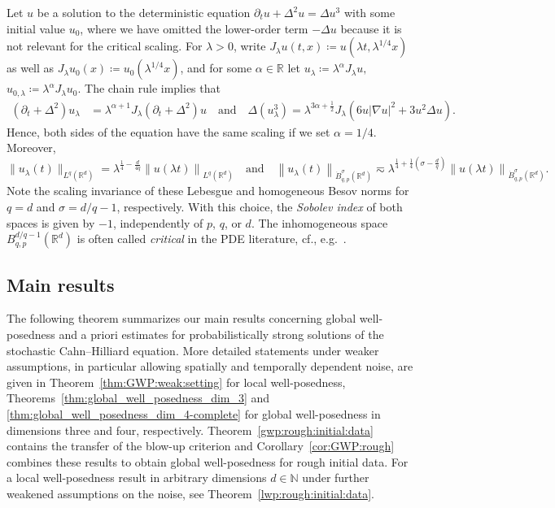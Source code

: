 \documentclass[reqno]{amsart}
\newcommand{\N}{\mathbb{N}}
\newcommand{\R}{\mathbb{R}}
\newcommand{\ce}{\coloneqq}
\newcommand{\1}{\mathbf{1}}
\newcommand{\nrm}[1]{\left\lVert #1 \right\rVert}
\begin{document}
Let $u$ be a solution to the deterministic equation $\partial_t u +\Delta^2u = \Delta u^3$ with some initial value $u_0$, where we have omitted the lower-order term $-\Delta u$ because it is not relevant for the critical scaling.
For $\lambda>0$, write $J_\lambda u(t,x)\ce  u(\lambda t, \lambda^{1/4}x)$ as well as $J_\lambda u_{0}(x)\ce u_0(\lambda^{1/4}x)$, and  for some $\alpha\in\R$ let $u_\lambda\ce \lambda^{\alpha} J_\lambda u, $ $u_{0,\lambda}\ce \lambda^{\alpha}J_\lambda u_0$. 
The chain rule implies that 
\[\begin{aligned}
    (\partial_t +\Delta^2) u_\lambda &= \lambda^{\alpha+1} J_\lambda(\partial_t+\Delta^2)u\quad \text{and}\quad 
    \Delta(u_\lambda^3)= \lambda^{3\alpha+\frac{1}{2}}J_\lambda(6  u |\nabla u|^2 +3 u^2\Delta u).
\end{aligned}\]
Hence, both sides of the equation have the same scaling if we set $\alpha=1/4$. Moreover, 
\[\|u_\lambda(t)\|_{L^q(\R^d)}= \lambda^{\frac14-\frac{d}{4q}}\nrm{u(\lambda t)}_{L^q(\R^d)}\quad\text{and}\quad\nrm{u_\lambda(t)}_{\Dot{B}^{\sigma}_{q,p}(\R^d)}\eqsim\lambda^{\frac14+\frac{1}{4}(\sigma-\frac{d}{q})}\nrm{u(\lambda t)}_{\Dot{B}_{q,p}^\sigma(\R^d)}.\]
Note the scaling invariance of these Lebesgue and homogeneous Besov norms for $q=d$ and $\sigma = d/q-1$, respectively. With this choice, the \emph{Sobolev index} of both spaces is given by $-1$, independently of $p$, $q$, or $d$. The inhomogeneous space $B^{d/q-1}_{q,p}(\R^d)$ is often called \emph{critical} in the PDE literature, cf., e.g.~\cite{prussCriticalSpacesQuasilinear2018}.

\subsection{Main results}

The following theorem summarizes our main results concerning global well-posedness and a priori estimates for probabilistically strong solutions of the stochastic Cahn--Hilliard equation. More detailed statements under weaker assumptions, in particular allowing spatially and temporally dependent noise, are given in Theorem~\ref{thm:GWP:weak:setting} for local well-posedness, Theorems~\ref{thm:global_well_posedness_dim_3} and \ref{thm:global_well_posedness_dim_4-complete} for global well-posedness in dimensions three and four, respectively. Theorem~\ref{gwp:rough:initial:data} contains the transfer of the blow-up criterion and Corollary~\ref{cor:GWP:rough} combines these results to obtain global well-posedness for rough initial data. For a local well-posedness result in arbitrary dimensions $d\in\N$ under further weakened assumptions on the noise, see Theorem~\ref{lwp:rough:initial:data}.
\end{document}
